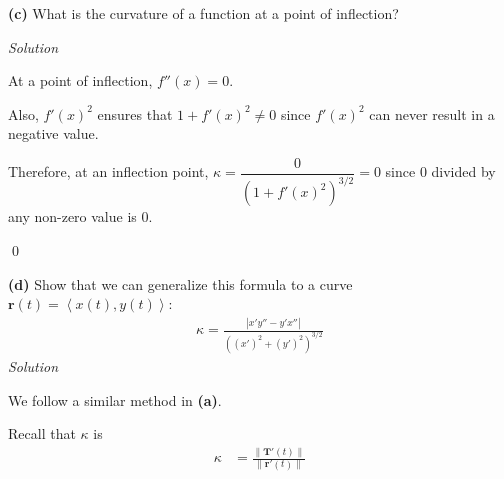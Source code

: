 \documentclass{article}
\newcommand{\lra}[1]{\left\langle #1 \right\rangle}
\newcommand{\T}[0]{\mathbf{T}}
\renewcommand{\r}[0]{\mathbf{r}}
\newcommand{\Solution}{\textit{Solution}}
\begin{document}
{}\textbf{(c)} What is the curvature of a function at a point of inflection?

\Solution

At a point of inflection, $f''(x)=0$. 

Also, $f'(x)^2$ ensures that $1+f'(x)^2\neq 0$ since $f'(x)^2$ can never result in a negative value. 

Therefore, at an inflection point, $\kappa = \dfrac{0}{(1 + f'(x)^2)^{3/2}}=0$ since $0$ divided by any non-zero value is $0$.

\qed
\newpage
{}
{}\textbf{(d)} Show that we can generalize this formula to a curve $\r(t)=\lra{x(t),y(t)}$:
\begin{align*}
    \kappa=\frac{\left|x'y''-y'x''\right|}{((x')^2+(y')^2)^{3/2}}
\end{align*}
\Solution

We follow a similar method in \textbf{(a)}.

Recall that $\kappa$ is
\begin{align*}
    \kappa&=\frac{\lVert \T'(t)\rVert}{\lVert \r'(t)\rVert}
\end{align*}
\end{document}
